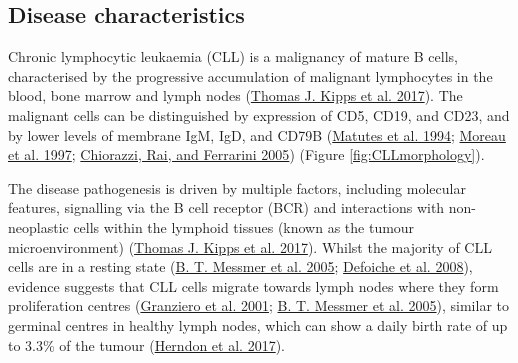 \documentclass[11pt, a4paper, twosided]{book}
\begin{document}
\hypertarget{intro-disease-characteristics}{%
\subsection{Disease characteristics}\label{intro-disease-characteristics}}

Chronic lymphocytic leukaemia (CLL) is a malignancy of mature B cells, characterised by the progressive accumulation of malignant lymphocytes in the blood, bone marrow and lymph nodes (\protect\hyperlink{ref-Kipps2017}{Thomas J. Kipps et al. 2017}). The malignant cells can be distinguished by expression of CD5, CD19, and CD23, and by lower levels of membrane IgM, IgD, and CD79B (\protect\hyperlink{ref-Matutes1994}{Matutes et al. 1994}; \protect\hyperlink{ref-Moreau1997}{Moreau et al. 1997}; \protect\hyperlink{ref-Chiorazzi2005}{Chiorazzi, Rai, and Ferrarini 2005}) (Figure \ref{fig:CLLmorphology}).

The disease pathogenesis is driven by multiple factors, including molecular features, signalling via the B cell receptor (BCR) and interactions with non-neoplastic cells within the lymphoid tissues (known as the tumour microenvironment) (\protect\hyperlink{ref-Kipps2017}{Thomas J. Kipps et al. 2017}). Whilst the majority of CLL cells are in a resting state (\protect\hyperlink{ref-Messmer2005}{B. T. Messmer et al. 2005}; \protect\hyperlink{ref-Defoiche2008}{Defoiche et al. 2008}), evidence suggests that CLL cells migrate towards lymph nodes where they form proliferation centres (\protect\hyperlink{ref-Granziero2001}{Granziero et al. 2001}; \protect\hyperlink{ref-Messmer2005}{B. T. Messmer et al. 2005}), similar to germinal centres in healthy lymph nodes, which can show a daily birth rate of up to 3.3\% of the tumour (\protect\hyperlink{ref-Herndon2017}{Herndon et al. 2017}).
\end{document}
